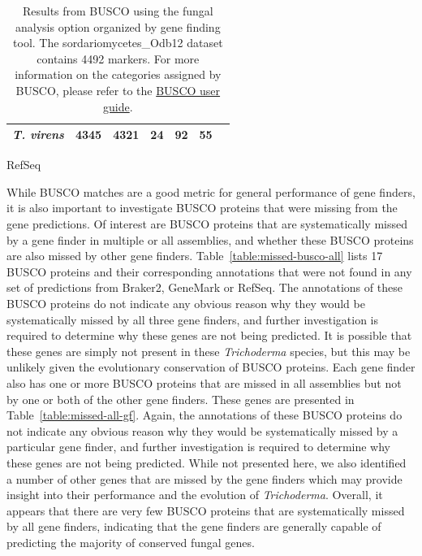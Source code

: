 \begin{table}
\begin{center}
\begin{subtable}{\textwidth}
\begin{tabular}{|c|c|c|c|c|c|c|}
        \textit{T. virens} & 4345 & 4321 & 24 & 92 & 55 \\ \hline  
      \end{tabular}
      \caption{RefSeq}
    \end{subtable}
  \end{center}
  \caption[BUSCO results]{Results from BUSCO using the fungal analysis option
    organized by gene finding tool. The sordariomycetes\_Odb12 dataset
    contains 4492 markers. For more information on the categories
    assigned by BUSCO, please refer to the \href{https://busco.ezlab.org/busco\_userguide.html\#interpreting-the-results}{BUSCO user guide}.}
    \label{table:busco}
\end{table}

While BUSCO matches are a good metric for general performance of gene
finders, it is also important to investigate BUSCO proteins that were missing from the gene predictions. Of interest are BUSCO proteins that are systematically missed by a gene finder in multiple or all assemblies, and whether these BUSCO proteins are also missed by other gene finders. Table~\ref{table:missed-busco-all} lists 17 BUSCO proteins and their corresponding annotations that were not found in any set of predictions from Braker2, GeneMark or RefSeq. The annotations of these BUSCO proteins do not indicate any obvious reason why they would be systematically missed by all three gene finders, and further investigation is required to determine why these genes are not being predicted. It is possible that these genes are simply not present in these \textit{Trichoderma} species, but this may be unlikely given the evolutionary conservation of BUSCO proteins. Each gene finder also has one or more BUSCO proteins that are missed in all assemblies but not by one or both of the other gene finders. These genes are presented in Table~\ref{table:missed-all-gf}. Again, the annotations of these BUSCO proteins do not indicate any obvious reason why they would be systematically missed by a particular gene finder, and further investigation is required to determine why these genes are not being predicted. While not presented here, we also identified a number of other genes that are missed by the gene finders which may provide insight into their performance and the evolution of \textit{Trichoderma}. Overall, it appears that there are very few BUSCO proteins that are systematically missed by all gene finders, indicating that the gene finders are generally capable of predicting the majority of conserved fungal genes.


